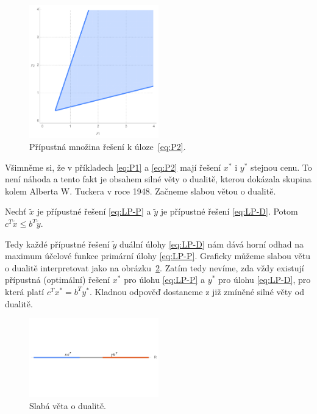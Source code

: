 \begin{figure}[h!]
    \centering
    \includegraphics[width=0.5\textwidth]{img/ex2.png}   
    \caption{Přípustná množina řešení k úloze~\ref{eq:P2}.}
    \label{fig:ex2}
\end{figure}

Všimněme si, že v příkladech \ref{eq:P1} a \ref{eq:P2} mají řešení $x^*$ i $y^*$ stejnou cenu. To není náhoda a tento fakt je obsahem silné věty o dualitě, kterou dokázala skupina kolem Alberta W. Tuckera v roce 1948. Začneme slabou větou o dualitě.

\begin{vt}
    Nechť $\tilde{x}$ je přípustné řešení \ref{eq:LP-P} a $\tilde{y}$ je přípustné řešení \ref{eq:LP-D}. Potom $c^T \tilde{x} \leq b^T \tilde{y}$.
\end{vt}

Tedy každé přípustné řešení $\tilde{y}$ duální úlohy \ref{eq:LP-D} nám dává horní odhad na maximum účelové funkce primární úlohy \ref{eq:LP-P}. Graficky můžeme slabou větu o dualitě interpretovat jako na obrázku~\ref{fig:weak_duality}. Zatím tedy nevíme, zda vždy existují přípustná (optimální) řešení $x^*$ pro úlohu \ref{eq:LP-P} a $y^*$ pro úlohu \ref{eq:LP-D}, pro která platí $c^T x^* = b^T y^*$. Kladnou odpověď dostaneme z již zmíněné silné věty od dualitě.

\begin{figure}[h!]
    \centering
    \includegraphics[width=0.5\textwidth]{img/weak_duality.png}   
    \caption{Slabá věta o dualitě.}
    \label{fig:weak_duality}
\end{figure}

